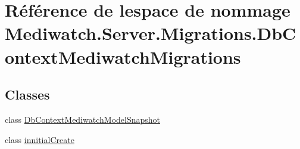 \hypertarget{namespace_mediwatch_1_1_server_1_1_migrations_1_1_db_context_mediwatch_migrations}{}\section{Référence de l\textquotesingle{}espace de nommage Mediwatch.\+Server.\+Migrations.\+Db\+Context\+Mediwatch\+Migrations}
\label{namespace_mediwatch_1_1_server_1_1_migrations_1_1_db_context_mediwatch_migrations}
\subsection*{Classes}
\begin{DoxyCompactItemize}
\item 
class \hyperlink{class_mediwatch_1_1_server_1_1_migrations_1_1_db_context_mediwatch_migrations_1_1_db_context_mediwatch_model_snapshot}{Db\+Context\+Mediwatch\+Model\+Snapshot}
\item 
class \hyperlink{class_mediwatch_1_1_server_1_1_migrations_1_1_db_context_mediwatch_migrations_1_1innitial_create}{innitial\+Create}
\end{DoxyCompactItemize}
